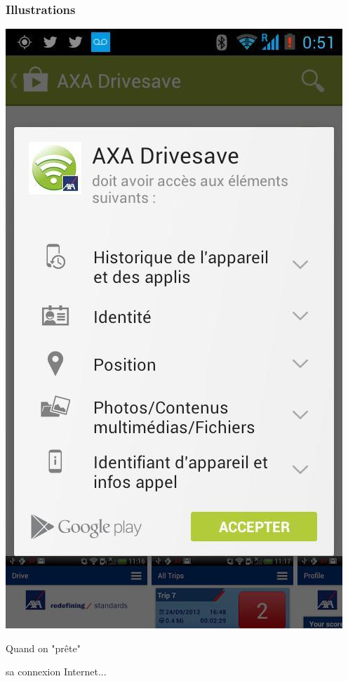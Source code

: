\documentclass{beamer}
\begin{document}
\begin{frame}
\frametitle{Illustrations}
\begin{center}
\includegraphics[scale=0.3]{./images/AXA_assurance_gps.jpg}
\end{center}
\end{frame}
\begin{frame}
\Huge{\centerline{Quand on "prête" }}
\Huge{\centerline{sa connexion Internet...}}
\end{frame}
\end{document}
